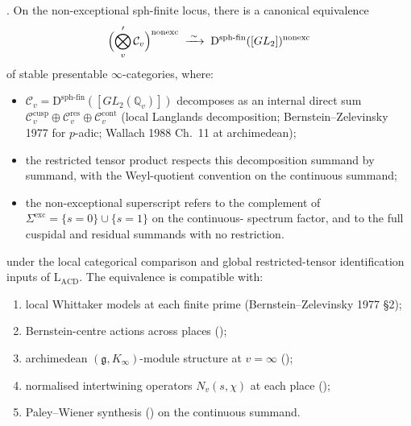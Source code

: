 \begin{theorem}
\label{v4-arith:w6-d:thm:LACD-Eisenstein-nonexc}
\ClaimStatusProvedHereConditional. On the non-exceptional sph-finite locus,
there is a canonical equivalence
\begin{equation}
\label{v4-arith:w6-d:eq:LACD-Eisenstein-nonexc}
\Bigl(\bigotimes_{v}^{\prime}\mathcal{C}_{v}\Bigr)^{\mathrm{nonexc}}\;\xrightarrow{\;\sim\;}\;\mathrm{D}^{\mathrm{sph\text{-}fin}}([GL_{2}])^{\mathrm{nonexc}}
\end{equation}
of stable presentable \(\infty\)-categories, where:
\begin{itemize}
\item \(\mathcal{C}_{v}=\mathrm{D}^{\mathrm{sph\text{-}fin}}([GL_{2}(\mathbb{Q}_{v})])\)
decomposes as an internal direct sum
\(\mathcal{C}^{\mathrm{cusp}}_{v}\oplus\mathcal{C}^{\mathrm{res}}_{v}\oplus\mathcal{C}^{\mathrm{cont}}_{v}\)
(local Langlands decomposition; Bernstein--Zelevinsky 1977 for
\(p\)-adic; Wallach 1988 Ch.~11 at archimedean);
\item the restricted tensor product respects this decomposition
summand by summand, with the Weyl-quotient convention on the
continuous summand;
\item the non-exceptional superscript refers to the complement of
\(\Sigma^{\mathrm{exc}}=\{s=0\}\cup\{s=1\}\) on the continuous-
spectrum factor, and to the full cuspidal and residual summands
with no restriction.
\end{itemize}
under the local categorical comparison and global restricted-tensor
identification inputs of \(\mathrm{L}_{\mathrm{ACD}}\). The equivalence
is compatible with:
\begin{enumerate}
\item local Whittaker models at each finite prime
(Bernstein--Zelevinsky 1977 \S 2);
\item Bernstein-centre actions across places
();
\item archimedean \((\mathfrak{g},K_{\infty})\)-module structure at
\(v=\infty\) ();
\item normalised intertwining operators
\(N_{v}(s,\chi)\) at each place ();
\item Paley--Wiener synthesis
() on the continuous summand.
\end{enumerate}
\end{theorem}

